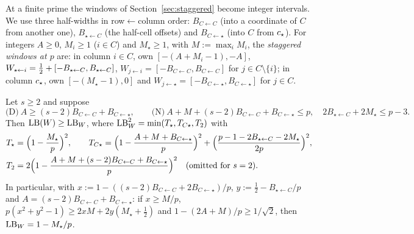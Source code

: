 At a finite prime the windows of Section~\ref{sec:staggered} become integer intervals. We use three half-widths in row$\leftarrow$column order: $B_{C\leftarrow C}$ (into a coordinate of $C$ from another one), $B_{\star\leftarrow C}$ (the half-cell offsets) and $B_{C\leftarrow\star}$ (into $C$ from $c_{\star}$). For integers $A\ge0$, $M_i\ge1$ ($i\in C$) and $M_\star\ge1$, with $M:=\max_iM_i$, the \emph{staggered windows at $p$} are: in column $i\in C$, own $[-(A+M_i-1),-A]$, $W_{\star\leftarrow i}=\tfrac12+[-B_{\star\leftarrow C},B_{\star\leftarrow C}]$, $W_{j\leftarrow i}=[-B_{C\leftarrow C},B_{C\leftarrow C}]$ for $j\in C\setminus\{i\}$; in column $c_{\star}$, own $[-(M_\star-1),0]$ and $W_{j\leftarrow\star}=[-B_{C\leftarrow\star},B_{C\leftarrow\star}]$ for $j\in C$.

\begin{lemma}\label{lem:W}
Let $s\ge2$ and suppose
\[
\text{(D)}\ A\ge(s-2)B_{C\leftarrow C}+B_{C\leftarrow\star},\qquad\text{(N)}\ A+M+(s-2)B_{C\leftarrow C}+B_{C\leftarrow\star}\le p,\quad 2B_{\star\leftarrow C}+2M_\star\le p-3 .
\]
Then $\mathrm{LB}(W)\ge\mathrm{LB}_W$, where $\mathrm{LB}_W^2=\min(T_\star,T_{C\star},T_2)$ with
\begin{align*}
T_\star&=\Bigl(1-\frac{M_\star}p\Bigr)^2,\qquad T_{C\star}=\Bigl(1-\frac{A+M+B_{C\leftarrow\star}}p\Bigr)^2+\Bigl(\frac{p-1-2B_{\star\leftarrow C}-2M_\star}{2p}\Bigr)^2,\\
T_2&=2\Bigl(1-\frac{A+M+(s-2)B_{C\leftarrow C}+B_{C\leftarrow\star}}p\Bigr)^2\quad(\text{omitted for }s=2).
\end{align*}
In particular, with $x:=1-((s-2)B_{C\leftarrow C}+2B_{C\leftarrow\star})/p$, $y:=\frac12-B_{\star\leftarrow C}/p$ and $A=(s-2)B_{C\leftarrow C}+B_{C\leftarrow\star}$: if $x\ge M/p$, $p(x^2+y^2-1)\ge2xM+2y(M_\star+\frac12)$ and $1-(2A+M)/p\ge1/\sqrt2$, then $\mathrm{LB}_W=1-M_\star/p$.
\end{lemma}

